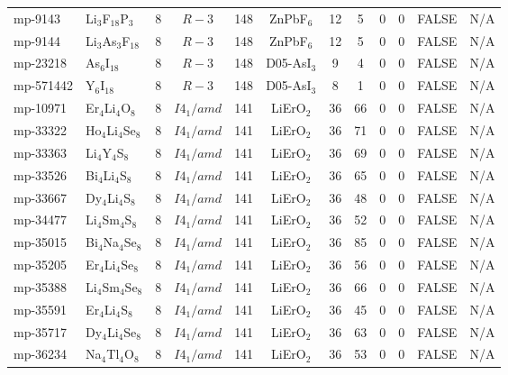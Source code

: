{\begin{longtable}{llcccccccccc}
    mp-9143 & Li$_{3}$F$_{18}$P$_{3}$ & 8     & $R-3$ & 148   & ZnPbF$_{6}$ & 12    & 5     & 0     & 0     & FALSE & N/A \\
    mp-9144 & Li$_{3}$As$_{3}$F$_{18}$ & 8     & $R-3$ & 148   & ZnPbF$_{6}$ & 12    & 5     & 0     & 0     & FALSE & N/A \\
    mp-23218 & As$_{6}$I$_{18}$ & 8     & $R-3$ & 148   & D05-AsI$_{3}$ & 9     & 4     & 0     & 0     & FALSE & N/A \\
    mp-571442 & Y$_{6}$I$_{18}$ & 8     & $R-3$ & 148   & D05-AsI$_{3}$ & 8     & 1     & 0     & 0     & FALSE & N/A \\
    mp-10971 & Er$_{4}$Li$_{4}$O$_{8}$ & 8     & $I4_1/amd$ & 141   & LiErO$_{2}$ & 36    & 66    & 0     & 0     & FALSE & N/A \\
    mp-33322 & Ho$_{4}$Li$_{4}$Se$_{8}$ & 8     & $I4_1/amd$ & 141   & LiErO$_{2}$ & 36    & 71    & 0     & 0     & FALSE & N/A \\
    mp-33363 & Li$_{4}$Y$_{4}$S$_{8}$ & 8     & $I4_1/amd$ & 141   & LiErO$_{2}$ & 36    & 69    & 0     & 0     & FALSE & N/A \\
    mp-33526 & Bi$_{4}$Li$_{4}$S$_{8}$ & 8     & $I4_1/amd$ & 141   & LiErO$_{2}$ & 36    & 65    & 0     & 0     & FALSE & N/A \\
    mp-33667 & Dy$_{4}$Li$_{4}$S$_{8}$ & 8     & $I4_1/amd$ & 141   & LiErO$_{2}$ & 36    & 48    & 0     & 0     & FALSE & N/A \\
    mp-34477 & Li$_{4}$Sm$_{4}$S$_{8}$ & 8     & $I4_1/amd$ & 141   & LiErO$_{2}$ & 36    & 52    & 0     & 0     & FALSE & N/A \\
    mp-35015 & Bi$_{4}$Na$_{4}$Se$_{8}$ & 8     & $I4_1/amd$ & 141   & LiErO$_{2}$ & 36    & 85    & 0     & 0     & FALSE & N/A \\
    mp-35205 & Er$_{4}$Li$_{4}$Se$_{8}$ & 8     & $I4_1/amd$ & 141   & LiErO$_{2}$ & 36    & 56    & 0     & 0     & FALSE & N/A \\
    mp-35388 & Li$_{4}$Sm$_{4}$Se$_{8}$ & 8     & $I4_1/amd$ & 141   & LiErO$_{2}$ & 36    & 66    & 0     & 0     & FALSE & N/A \\
    mp-35591 & Er$_{4}$Li$_{4}$S$_{8}$ & 8     & $I4_1/amd$ & 141   & LiErO$_{2}$ & 36    & 45    & 0     & 0     & FALSE & N/A \\
    mp-35717 & Dy$_{4}$Li$_{4}$Se$_{8}$ & 8     & $I4_1/amd$ & 141   & LiErO$_{2}$ & 36    & 63    & 0     & 0     & FALSE & N/A \\
    mp-36234 & Na$_{4}$Tl$_{4}$O$_{8}$ & 8     & $I4_1/amd$ & 141   & LiErO$_{2}$ & 36    & 53    & 0     & 0     & FALSE & N/A \\

\end{longtable}}
